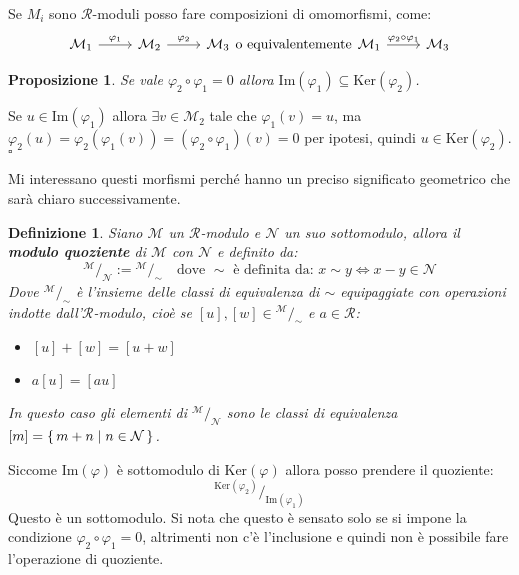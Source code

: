\documentclass[10pt, twoside=false, x11names]{scrbook}
\newtheorem{proposition}[theorem]{Proposizione}
\newtheorem{definition}[theorem]{Definizione}
\newenvironment{proof}{{\textbf{Dimostrazione}:}}{\hfill $\square$}
\newcommand{\R}{\mathcal{R}}
\newcommand{\M}{\mathcal{M}}
\newcommand{\N}{\mathcal{N}}
\newcommand{\im}[1]{\mathrm{Im}( #1 )}
\renewcommand{\ker}[1]{\mathrm{Ker}( #1)}
\renewcommand{\phi}{\varphi}
\newcommand*\quot[2]{{^{\textstyle #1}\big/_{\textstyle #2}}}
\begin{document}
Se $ M_i $ sono $ \R $-moduli posso fare composizioni di omomorfismi, come:
\[
  \begin{tikzcd}
    \M_1 \arrow{r}{\phi_1} & \M_2 \arrow{r}{\phi_2} & \M_3
  \end{tikzcd}
  \text{o equivalentemente}
  \begin{tikzcd}
    \M_1 \arrow{r}{\phi_2 \circ \phi_1} & \M_3
  \end{tikzcd}
\]
\begin{proposition}
Se vale $ \phi_2 \circ \phi_1 = 0 $ allora $ \im{\phi_1} \subseteq \ker{\phi_2} $.
\end{proposition}
\begin{proof}
  Se $ u \in \im {\phi_1} $ allora $ \exists v \in \M_2 $ tale che $ \phi_1(v) = u $,
  ma $ \phi_2(u) = \phi_2(\phi_1(v)) = (\phi_2 \circ \phi_1)(v) = 0 $ per ipotesi, quindi $ u \in \ker{\phi_2} $.
\end{proof}

Mi interessano questi morfismi perché hanno un preciso significato geometrico che
sarà chiaro successivamente.

\begin{definition}
  Siano $ \M $ un $ \R $-modulo e $ \N $ un suo sottomodulo, allora il \textbf{modulo
  quoziente}  di $ \M $ con $ \N $ e definito da:
  \[
    \quot{\M}{\N} := \quot{\M}{\sim} \quad \text{dove } \sim \text{ è definita da: } x \sim y \Leftrightarrow x - y \in \N
  \]
  Dove $ \quot{\M}{\sim} $ è l'insieme delle classi di equivalenza di $ \sim $ equipaggiate
  con operazioni indotte dall'$ \R $-modulo, cioè se $ [u], [w] \in \quot{\M}{\sim} $ e $ a \in \R $:
  \begin{itemize}
  \item $ [u] + [w] = [u + w] $
  \item $ a [u] = [au] $
  \end{itemize}
  In questo caso gli elementi di $ \quot{\M}{\N} $ sono le classi di equivalenza
  $ [m] = \set{ m + n | n \in \N } $.
\end{definition}

Siccome $ \im{\phi} $ è sottomodulo di $ \ker{\phi} $ allora posso prendere
il quoziente:
\[
  \quot{\ker{\phi_2}}{\im{\phi_1}}
\]
Questo è un sottomodulo. Si nota che questo è sensato solo se si impone la condizione
$ \phi_2 \circ \phi_1 = 0 $, altrimenti non c'è l'inclusione e quindi non è possibile fare l'operazione
di quoziente.
\end{document}
